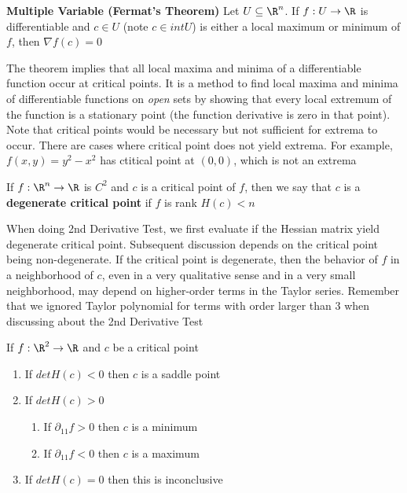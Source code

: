\documentclass[11pt]{article}
\begin{document}
\begin{proposition*}
  \textbf{Multiple Variable (Fermat's Theorem)} Let $U\subseteq \R^n$. If $f: U \to \R$ is differentiable and $c\in U$ (note $c\in intU$) is either a local maximum or minimum of $f$, then $\nabla f(c) = 0$
  \begin{rem}
    The theorem implies that all local maxima and minima of a differentiable function occur at critical points. It is a method to find local maxima and minima of differentiable functions on \textit{open} sets by showing that every local extremum of the function is a stationary point (the function derivative is zero in that point). Note that critical points would be necessary but not sufficient for extrema to occur. There are cases where critical point does not yield extrema. For example, $f(x,y) = y^2 - x^2$ has ctitical point at $(0,0)$, which is not an extrema
  \end{rem}
\end{proposition*}

\begin{defn*}
  If $f: \R^n \to \R$ is $C^2$ and $c$ is a critical point of $f$,  then we say that $c$ is a \textbf{degenerate critical point} if $f$ is rank $H(c) < n$
  \begin{rem}
    When doing 2nd Derivative Test, we first evaluate if the Hessian matrix yield degenerate critical point. Subsequent discussion depends on the critical point being non-degenerate. If the critical point is degenerate, then the behavior of $f$ in a neighborhood of $c$, even in a very qualitative sense and in a very small neighborhood, may depend on higher-order terms in the Taylor series. Remember that we ignored Taylor polynomial for terms with order larger than 3 when discussing about the 2nd Derivative Test
  \end{rem}
\end{defn*}


\begin{proposition*}
  If $f:\R^2 \to \R$ and $c$ be a critical point
  \begin{enumerate}
    \item If $det H(c) < 0$ then $c$ is a saddle point
    \item If $det H(c) > 0$
    \begin{enumerate}
      \item If $\partial_{11} f > 0$ then $c$ is a minimum
      \item If $\partial_{11} f < 0$ then $c$ is a maximum
    \end{enumerate}
    \item If $det H(c) = 0$ then this is inconclusive
   \end{enumerate}
\end{proposition*}
\end{document}
